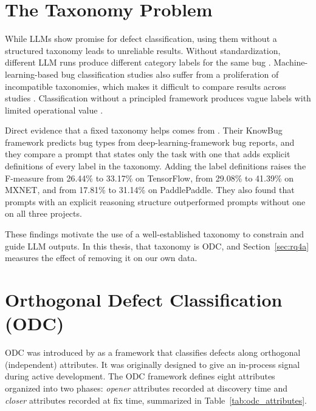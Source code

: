 \documentclass{iutbscthesis}
\begin{document}
\section{The Taxonomy Problem}

While LLMs show promise for defect classification, using them without a structured taxonomy leads to unreliable results. Without standardization, different LLM runs produce different category labels for the same bug \cite{koyuncu2025exploring}. Machine-learning-based bug classification studies also suffer from a proliferation of incompatible taxonomies, which makes it difficult to compare results across studies \cite{andrade2025empirical}. Classification without a principled framework produces vague labels with limited operational value \cite{thung2012automatic}.

Direct evidence that a fixed taxonomy helps comes from \textcite{li2024knowbug}. Their KnowBug framework predicts bug types from deep-learning-framework bug reports, and they compare a prompt that states only the task with one that adds explicit definitions of every label in the taxonomy. Adding the label definitions raises the F-measure from 26.44\% to 33.17\% on TensorFlow, from 29.08\% to 41.39\% on MXNET, and from 17.81\% to 31.14\% on PaddlePaddle. They also found that prompts with an explicit reasoning structure outperformed prompts without one on all three projects.

These findings motivate the use of a well-established taxonomy to constrain and guide LLM outputs. In this thesis, that taxonomy is ODC, and Section~\ref{sec:rq4a} measures the effect of removing it on our own data.

\section{Orthogonal Defect Classification (ODC)} \label{sec:odc}

ODC was introduced by \textcite{chillarege1992odc} as a framework that classifies defects along orthogonal (independent) attributes. It was originally designed to give an in-process signal during active development. The ODC framework defines eight attributes organized into two phases: \emph{opener} attributes recorded at discovery time and \emph{closer} attributes recorded at fix time, summarized in Table~\ref{tab:odc_attributes}.
\end{document}
